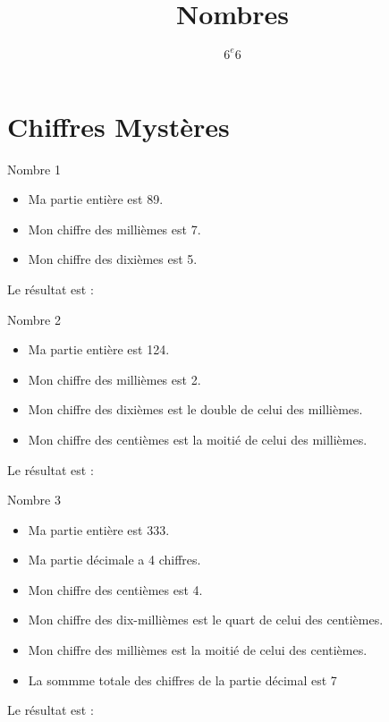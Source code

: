 \documentclass{beamer}
\title{Nombres}
\author{$6^{e}6$}
\begin{document}
\frame{\titlepage}


\section{Chiffres Mystères}

\frame{\tableofcontents[sectionstyle=show/shaded]}

\begin{frame}
  \begin{block}{Nombre 1}
      \begin{itemize}
            \item Ma partie entière est 89.
            \item Mon chiffre des millièmes est 7. 
            \item Mon chiffre des dixièmes est 5.
      \end{itemize}
      Le résultat est : 
  \end{block} 
\end{frame}

\begin{frame}
  \begin{block}{Nombre 2}
      \begin{itemize}
            \item Ma partie entière est 124.
            \item Mon chiffre des millièmes est 2. 
            \item Mon chiffre des dixièmes est le double de celui des millièmes.
            \item Mon chiffre des centièmes est la moitié de celui des millièmes.
      \end{itemize}
      Le résultat est : 
  \end{block} 
\end{frame}

\begin{frame}
  \begin{block}{Nombre 3}
      \begin{itemize}
            \item Ma partie entière est 333.
            \item Ma partie décimale a 4 chiffres.
            \item Mon chiffre des centièmes est 4. 
            \item Mon chiffre des dix-millièmes est le quart de celui des centièmes.
            \item Mon chiffre des millièmes est la moitié de celui des centièmes.
            \item La sommme totale des chiffres de la partie décimal est 7
      \end{itemize}
      Le résultat est : 
  \end{block} 
\end{frame}
\end{document}
